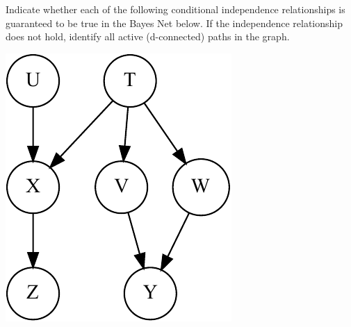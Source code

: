 \documentclass[addpoints, answers, 11pt, a4paper]{exam}
\newcommand*{\onevalid}{\checkboxchar{$\bigcirc$}}
\newcommand*{\checkbox}[1][]{\ifx&#1&\choice\else\CorrectChoice\fi}
\newcommand*{\prob}[1]{\ensuremath{\mathsf{P}(#1)}}
\newcommand*{\indep}{\ensuremath{\perp \!\!\! \perp}}
\begin{document}
\begin{questions}
		
		
		\newpage
		\onevalid
		\question[4] Indicate whether each of the following conditional independence relationships is guaranteed to be true in the Bayes Net below. If the independence relationship does not hold, identify all active (d-connected) paths in the graph.
		\label{q:dseparation}
		
		{\centering\includegraphics[width=.3\linewidth]{res/separation} \\}
		
\end{questions}
\end{document}

